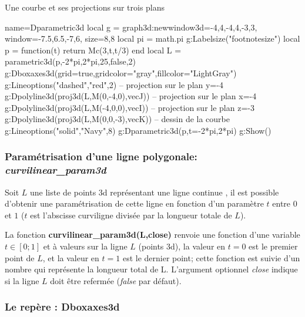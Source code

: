 \begin{demo}{Une courbe et ses projections sur trois plans} 
\begin{luadraw}{name=Dparametric3d}
local g = graph3d:new{window3d={-4,4,-4,4,-3,3}, window={-7.5,6.5,-7,6}, size={8,8}}
local pi = math.pi
g:Labelsize("footnotesize")
local p = function(t) return Mc(3,t,t/3) end
local L = parametric3d(p,-2*pi,2*pi,25,false,2)
g:Dboxaxes3d({grid=true,gridcolor="gray",fillcolor="LightGray"})
g:Lineoptions("dashed","red",2)
-- projection sur le plan y=-4
g:Dpolyline3d(proj3d(L,{M(0,-4,0),vecJ}))
-- projection sur le plan x=-4
g:Dpolyline3d(proj3d(L,{M(-4,0,0),vecI}))
-- projection sur le plan z=-3
g:Dpolyline3d(proj3d(L,{M(0,0,-3),vecK}))
-- dessin de la courbe
g:Lineoptions("solid","Navy",8)
g:Dparametric3d(p,{t={-2*pi,2*pi}})
g:Show()
\end{luadraw}
\end{demo}

\subsubsection{Paramétrisation d'une ligne polygonale: \emph{curvilinear\_param3d}}
Soit $L$ une liste de points 3d représentant une ligne \og continue \fg, il est possible d'obtenir une paramétrisation de cette ligne en fonction d'un paramètre $t$ entre $0$ et $1$ ($t$ est l'abscisse curviligne divisée par la longueur totale de $L$).

La fonction \textbf{curvilinear\_param3d(L,close)} renvoie une fonction d'une variable $t\in[0;1]$ et à valeurs sur la ligne  $L$ (points 3d), la valeur en $t=0$ est le premier point de $L$, et la valeur en $t=1$ est le dernier point; cette fonction est suivie d'un nombre qui représente la longueur total de L. L'argument optionnel \emph{close} indique si la ligne $L$  doit être refermée (\emph{false} par défaut).


\subsubsection{Le repère : Dboxaxes3d}

